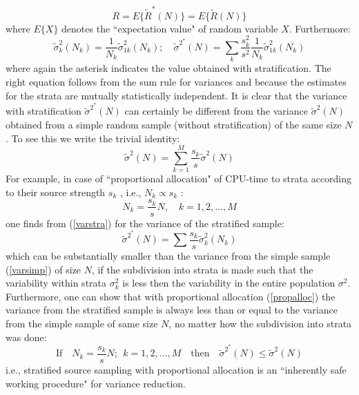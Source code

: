 \begin{equation}
R = E\{\tilde R^*(N)\} = E\{\tilde R(N)\}
\end{equation}
where $E\{X\}$ denotes the ``expectation value" of random variable $X$.
Furthermore:
\begin{equation}\label{varstra}
\tilde \sigma^2_{k}(N_k)  = \frac{1}{N_k}\tilde \sigma^2_{1k}(N_k); \quad \tilde \sigma^{2^*}(N)  = \sum_k \frac{s_k^2}{s^2}\frac{1}{N_k}\tilde \sigma^2_{1k}(N_k)
\end{equation}
where again the asterisk indicates the value obtained with stratification.
The right equation follows from the sum rule for variances and because
the estimates for the strata are mutually statistically independent.
It is clear that the variance with stratification $\tilde \sigma^{2^*}(N)$ can certainly be different from the variance $\tilde \sigma^2(N)$ obtained  from a simple random sample (without stratification) of the same size $N$.
To see this we write the trivial identity:
\begin{equation}\label{varsimp}
\tilde \sigma^2(N) = \sum_{k=1}^{M}\frac{s_k}{s} \tilde\sigma^2(N)
\end{equation}
For example, in case of ``proportional allocation" of CPU-time to strata according to their source strength $s_k$ , i.e.,  $N_k \propto s_k$ :
\begin{equation}\label{propalloc}
N_k=\frac{s_k}{s} N, \quad k=1,2,\dots,M
\end{equation}
one finds from (\ref{varstra}) for the variance of the stratified sample:
\begin{equation}
 \tilde \sigma^{2^*}(N)  = \sum \frac{s_k}{s}\tilde \sigma^2_{k}(N_k)
\end{equation}
which can be substantially smaller than the variance from the simple sample (\ref{varsimp}) of size $N$, if the
subdivision into strata is made such that the variability within strata $\sigma_k^2$ is less then the variability
in the entire population $\sigma^2$.
Furthermore, one can show that with proportional allocation (\ref{propalloc}) the variance from the stratified sample is
always less than or equal to the variance from the simple sample of same size $N$, no matter how the subdivision into strata was
done:
\begin{equation}
\mbox{If} \quad N_k=\frac{s_k}{s} N; ~~ k=1,2,\dots,M \quad \mbox{then} \quad  \tilde \sigma^{2^*}(N) \leq \tilde \sigma^{2}(N)
\end{equation}
i.e., stratified source sampling with proportional allocation is an ``inherently safe working procedure" for variance reduction.


